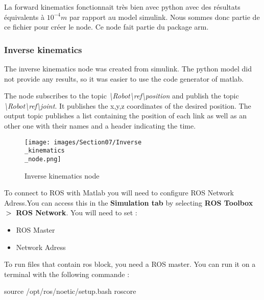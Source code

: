 \hspace{\parindent} La forward kinematics fonctionnait très bien avec python avec des résultats équivalents à $10^{-4}m$ par rapport au model simulink. Nous sommes donc partie de ce fichier pour créer le node. Ce node fait partie du package arm. 

\subsubsection{Inverse kinematics}

\hspace{\parindent} The inverse kinematics node was created from simulink. The python model did not provide any results, so it was easier to use the code generator of matlab.

\bigbreak
The node subscribes to the topic \textit{\textbackslash Robot\textbackslash ref\textbackslash position} and publish the topic \textit{\textbackslash Robot\textbackslash ref\textbackslash joint}. It publishes the x,y,z coordinates of the desired position. The output topic publishes a list containing the position of each link as well as an other one with their names and a header indicating the time.
\bigbreak
\begin{figure}[ht]
    \centering
    \texttt{[image: images/Section07/Inverse\\\_kinematics\\\_node.png]}
    \caption{Inverse kinematics node}
    \label{fig:mesh21}
\end{figure}
\FloatBarrier

\bigbreak
To connect to ROS with Matlab you will need to configure ROS Network Adress.You can access this in the \textbf{Simulation tab} by selecting \textbf{ROS Toolbox} $\bg$ \textbf{ROS Network}. You will need to set :
\begin{multicols}{2}
    \begin{itemize}[noitemsep]
        \item ROS Master
        \item Network Adress
    \end{itemize}
\end{multicols}

\bigbreak
To run files that contain ros block, you need a ROS master. You can run it on a terminal with the following commande :
\begin{commandshell}
    source /opt/ros/noetic/setup.bash
    roscore
\end{commandshell} 

